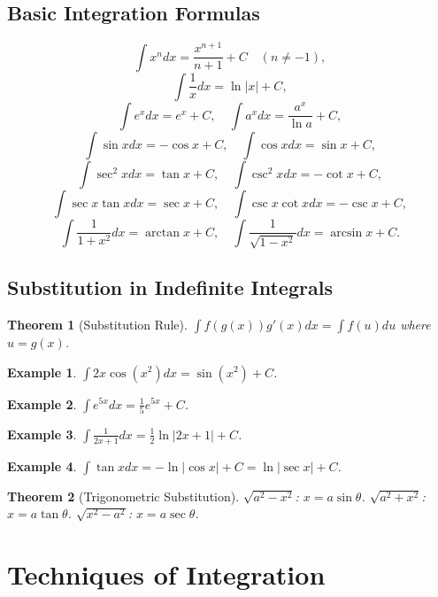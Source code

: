 \documentclass[11pt,a4paper]{article}
\newtheorem{example}{Example}
\newtheorem{theorem}{Theorem}
\begin{document}
\subsection{Basic Integration Formulas}
\[
\int x^n dx = \frac{x^{n+1}}{n+1} + C \quad (n \neq -1),
\]
\[
\int \frac{1}{x} dx = \ln|x| + C,
\]
\[
\int e^x dx = e^x + C, \quad \int a^x dx = \frac{a^x}{\ln a} + C,
\]
\[
\int \sin x dx = -\cos x + C, \quad \int \cos x dx = \sin x + C,
\]
\[
\int \sec^2 x dx = \tan x + C, \quad \int \csc^2 x dx = -\cot x + C,
\]
\[
\int \sec x \tan x dx = \sec x + C, \quad \int \csc x \cot x dx = -\csc x + C,
\]
\[
\int \frac{1}{1+x^2} dx = \arctan x + C, \quad \int \frac{1}{\sqrt{1-x^2}} dx = \arcsin x + C.
\]
\subsection{Substitution in Indefinite Integrals}
\begin{theorem}[Substitution Rule]
$\int f(g(x)) g'(x) dx = \int f(u) du$ where $u = g(x)$.
\end{theorem}
\begin{example}
$\int 2x\cos(x^2) dx = \sin(x^2) + C$.
\end{example}
\begin{example}
$\int e^{5x} dx = \frac{1}{5}e^{5x} + C$.
\end{example}
\begin{example}
$\int \frac{1}{2x+1} dx = \frac{1}{2}\ln|2x+1| + C$.
\end{example}
\begin{example}
$\int \tan x dx = -\ln|\cos x| + C = \ln|\sec x| + C$.
\end{example}
\begin{theorem}[Trigonometric Substitution]
$\sqrt{a^2-x^2}$: $x = a\sin\theta$. $\sqrt{a^2+x^2}$: $x = a\tan\theta$. $\sqrt{x^2-a^2}$: $x = a\sec\theta$.
\end{theorem}
\section{Techniques of Integration}
\end{document}
